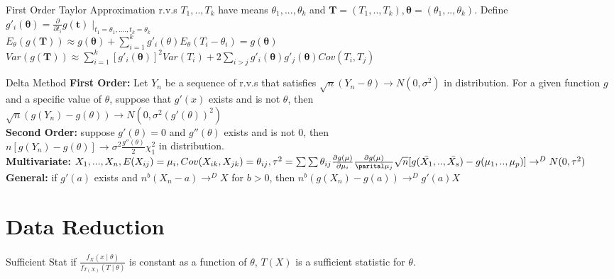 \documentclass{article}
\begin{document}
\begin{multicols*}{3}
\begin{thmbox}{First Order Taylor Approximation}
r.v.s $T_1, ..,T_k$ have means $\theta_1,...,\theta_k$ and $\boldsymbol{T} = (T_1,..,T_k), \boldsymbol{\theta} = (\theta_1, .., \theta_k)$. Define $g'_i(\boldsymbol{\theta}) = \frac{\partial}{\partial t_i}g(\boldsymbol{t})\mid_{t_1 = \theta_1,....,t_k=\theta_k}$\\
$E_{\theta}(g(\boldsymbol{T})) \approx g(\boldsymbol{\theta}) + \sum^{k}_{i = 1}g'_i(\theta)E_{\theta}(T_i - \theta_i) = g(\boldsymbol{\theta})$\\
$Var(g(\boldsymbol{T})) \approx \sum^{k}_{i = 1} [g'_i(\boldsymbol{\theta})]^2 Var(T_i) + 
2\sum_{i > j}g'_i(\boldsymbol{\theta})g'_j(\boldsymbol{\theta})Cov(T_i, T_j)$
\end{thmbox}
\clearpage
\begin{thmbox}{Delta Method}
\textbf{First Order:} Let $Y_n$ be a sequence of r.v.s that satisfies $\sqrt{n}(Y_n - \theta) \rightarrow N(0,\sigma^2)$ in distribution. For a given function $g$ and a specific value of $\theta$, suppose that $g'(x)$ exists and is not $\theta$, then \\
$\sqrt{n}(g(Y_n) - g(\theta)) \rightarrow N(0, \sigma^2(g'(\theta))^2)$\\
\textbf{Second Order:} suppose $g'(\theta) = 0$ and $g''(\theta)$ exists and is not 0, then \\
$n[g(Y_n) - g(\theta)] \rightarrow \sigma^2\frac{g''(\theta)}{2}\chi^2_1$ in distribution.\\
\textbf{Multivariate:} $X_1, ..., X_n, E(X_{ij}) = \mu_i,\\ Cov(X_{ik}, X_{jk}) = \theta_{ij}, \tau^2 = \sum \sum \theta_{ij}\frac{\partial g(\mu)}{\partial \mu_i }\frac{\partial g(\mu)}{\parital \mu_j} \\ 
\sqrt{n}[g(\Bar{X_1},..,\Bar{X_s}) - g(\mu_1,..,\mu_p)]\to^{D} N(0,\tau^2) $ \\
\textbf{General:} if $g'(a)$ exists and $n^b(X_n - a) \to^D X$ for $b > 0$, then $n^b(g(X_n) - g(a)) \to^D g'(a)X$
\end{thmbox}


\section{Data Reduction}

\begin{thmbox}{Sufficient  Stat}
if $\frac{f_X(x\mid \theta)}{f_{T(X)}(T\mid\theta)}$ is constant as a function of $\theta$, $T(X)$ is a sufficient statistic for $\theta$.
\end{thmbox}


\end{multicols*}
\end{document}
